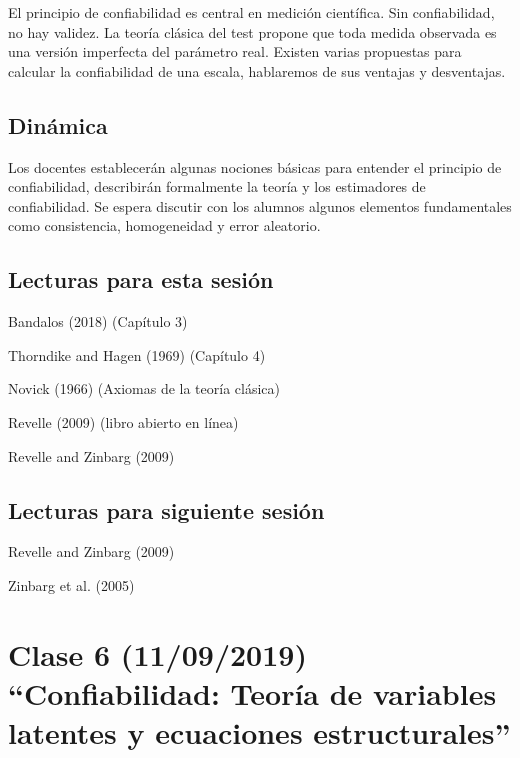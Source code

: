 \documentclass[11pt,]{article}
\begin{document}
El principio de confiabilidad es central en medición científica. Sin
confiabilidad, no hay validez. La teoría clásica del test propone que
toda medida observada es una versión imperfecta del parámetro real.
Existen varias propuestas para calcular la confiabilidad de una escala,
hablaremos de sus ventajas y desventajas.

\hypertarget{dinamica-4}{%
\subsection{Dinámica}\label{dinamica-4}}

Los docentes establecerán algunas nociones básicas para entender el
principio de confiabilidad, describirán formalmente la teoría y los
estimadores de confiabilidad. Se espera discutir con los alumnos algunos
elementos fundamentales como consistencia, homogeneidad y error
aleatorio.

\hypertarget{lecturas-para-esta-sesion-3}{%
\subsection{Lecturas para esta
sesión}\label{lecturas-para-esta-sesion-3}}

Bandalos (2018) (Capítulo 3)

Thorndike and Hagen (1969) (Capítulo 4)

Novick (1966) (Axiomas de la teoría clásica)

Revelle (2009) (libro abierto en línea)

Revelle and Zinbarg (2009)

\hypertarget{lecturas-para-siguiente-sesion-3}{%
\subsection{Lecturas para siguiente
sesión}\label{lecturas-para-siguiente-sesion-3}}

Revelle and Zinbarg (2009)

Zinbarg et al. (2005)

\hypertarget{clase-6-11092019-confiabilidad-teoria-de-variables-latentes-y-ecuaciones-estructurales}{%
\section{Clase 6 (11/09/2019) ``Confiabilidad: Teoría de variables
latentes y ecuaciones
estructurales''}\label{clase-6-11092019-confiabilidad-teoria-de-variables-latentes-y-ecuaciones-estructurales}}
\end{document}
